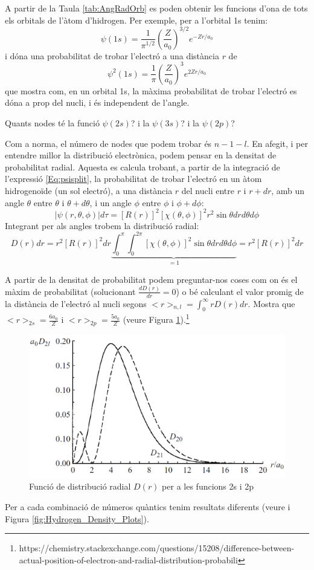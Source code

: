 A partir de la Taula \ref{tab:AngRadOrb} es poden obtenir les funcions d'ona de tots els orbitals de l'àtom d'hidrogen. Per exemple, per a l'orbital 1s tenim:
\[
\psi(1s)= \frac{1}{\pi^{1/2}} \left( \frac{Z}{a_0} \right)^{3/2} e^{-Zr/a_0}
\]
i dóna una probabilitat de trobar l'electró a una distància $r$ de
\[
\psi^2(1s)= \frac{1}{\pi} \left( \frac{Z}{a_0} \right)^{3} e^{2Zr/a_0}
\]
que mostra com, en un orbital 1s, la màxima probabilitat de trobar l'electró es dóna a prop del nucli, i és independent de l'angle. 

\begin{exr}
Quants nodes té la funció $\psi(2s)$? i la $\psi(3s)$? i la $\psi(2p)$? 
\end{exr}
Com a norma, el número de nodes que podem trobar és $n-1-l$. 
En afegit, i per entendre millor la distribució electrònica, podem pensar en la densitat de probabilitat radial.
Aquesta es calcula trobant, a partir de la integració de l'expressió \ref{Eq:psisplit}, la probabilitat de trobar l'electró en un àtom hidrogenoïde (un sol electró), a una distància $r$ del nucli entre $r$ i $r+dr$, amb un angle $\theta$ entre $\theta$ i $\theta+d\theta$, i un angle $\phi$ entre $\phi$ i $\phi+d\phi$:
\[
|\psi(r,\theta,\phi)| d\tau = [R(r)]^2 [\chi(\theta,\phi)]^2 r^2 \sin \theta dr d\theta d\phi
\]
Integrant per als angles trobem la distribució radial:
\[
D(r)dr=r^2[R(r)]^2 dr \underbrace{\int_0^{\pi} \int_0^{2\pi} [\chi(\theta,\phi)]^2 \sin \theta dr d\theta d\phi}_{=1}=r^2[R(r)]^2 dr
\]
\begin{exr}
A partir de la densitat de probabilitat podem preguntar-nos coses com on és el màxim de probabilitat (solucionant  $\frac{d D(r)}{dr}=0$) o bé calculant el valor promig de la distància de l'electró al nucli segons $<r>_{n,l}=\int_0^{\infty} r D(r)dr$. Mostra que $<r>_{2s}=\frac{6a_0}{Z}$ i $<r>_{2p}=\frac{5a_0}{Z}$ (veure Figura \ref{fig:D2s2p}).\footnote{https://chemistry.stackexchange.com/questions/15208/difference-between-actual-position-of-electron-and-radial-distribution-probabili}
\end{exr}
\begin{figure}[h]
\centering
\includegraphics[scale=0.35]{figures/D2s2p.png}
\caption{Funció de distribució radial $D(r)$ per a les funcions 2s i 2p}
\label{fig:D2s2p}
\end{figure}
Per a cada combinació de números quàntics tenim resultats diferents (veure  i Figura \ref{fig:Hydrogen_Density_Plots}).



